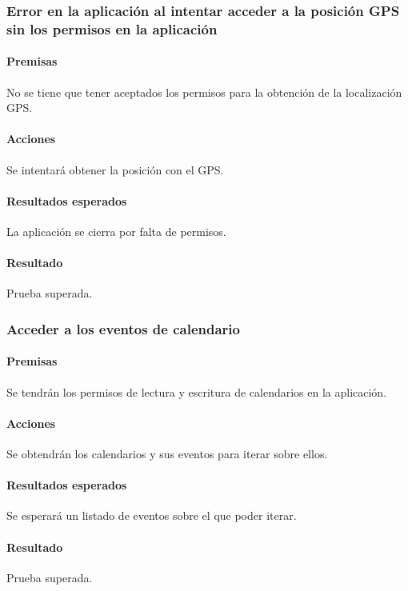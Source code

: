\subsubsection{Error en la aplicación al intentar acceder a la posición GPS sin los permisos en la aplicación}

\paragraph{Premisas}
No se tiene que tener aceptados los permisos para la obtención de la localización GPS.


\paragraph{Acciones}
Se intentará obtener la posición con el GPS.

\paragraph{Resultados esperados}
La aplicación se cierra por falta de permisos.

\paragraph{Resultado}
Prueba superada.

\subsubsection{Acceder a los eventos de calendario}

\paragraph{Premisas}
Se tendrán los permisos de lectura y escritura de calendarios en la aplicación.


\paragraph{Acciones}
Se obtendrán los calendarios y sus eventos para iterar sobre ellos.

\paragraph{Resultados esperados}
Se esperará un listado de eventos sobre el que poder iterar.

\paragraph{Resultado}
Prueba superada.

